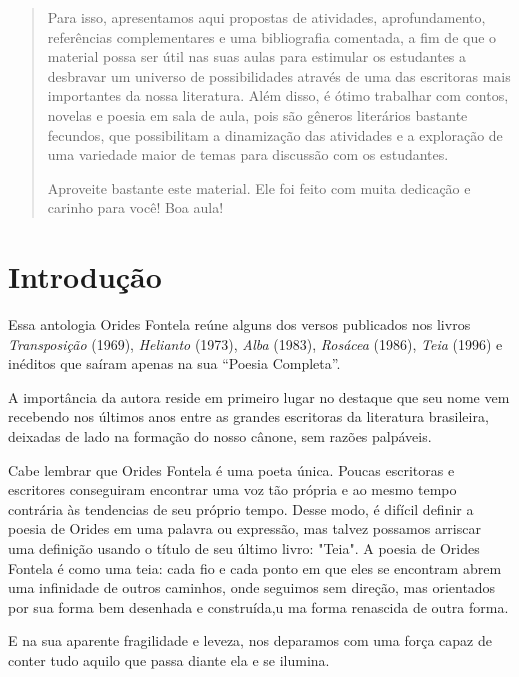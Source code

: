 \documentclass[12pt]{extarticle}
\begin{document}
\begin{abstract}


Para isso, apresentamos aqui propostas de atividades, aprofundamento,
referências complementares e uma bibliografia comentada, a fim de que o
material possa ser útil nas suas aulas para estimular os estudantes a
desbravar um universo de possibilidades através de uma das escritoras
mais importantes da nossa literatura. Além disso, é ótimo trabalhar com
contos, novelas e poesia em sala de aula, pois são gêneros literários
bastante fecundos, que possibilitam a dinamização das atividades e a
exploração de uma variedade maior de temas para discussão com os
estudantes.

Aproveite bastante este material. Ele foi feito com muita dedicação e
carinho para você! Boa aula!
\end{abstract}

\tableofcontents

\section{Introdução} 


Essa antologia Orides Fontela reúne alguns dos versos publicados nos livros \textit{Transposição} (1969), \textit{Helianto} (1973), \textit{Alba} (1983), \textit{Rosácea} (1986), \textit{Teia} (1996) e inéditos que saíram apenas na sua “Poesia Completa”.

A importância da autora reside em primeiro lugar no destaque que seu nome vem recebendo nos últimos anos entre  as grandes escritoras da literatura brasileira, deixadas de lado na formação do nosso cânone, sem razões palpáveis.

Cabe lembrar que Orides Fontela é uma poeta única.
Poucas escritoras e escritores conseguiram encontrar uma voz tão própria 
e ao mesmo tempo contrária às tendencias de seu próprio tempo.
Desse modo, é difícil definir a poesia de Orides em uma palavra ou expressão, mas talvez possamos arriscar uma definição usando o título de seu último livro: "Teia".
A poesia de Orides Fontela é como uma teia: cada fio e cada ponto em que eles se encontram abrem uma infinidade de outros caminhos, onde seguimos sem direção, mas orientados por sua forma bem desenhada e construída,u ma forma renascida de outra forma.

E na sua aparente fragilidade e leveza, nos deparamos com uma força capaz de conter tudo aquilo que passa diante ela e se ilumina.
\end{document}
